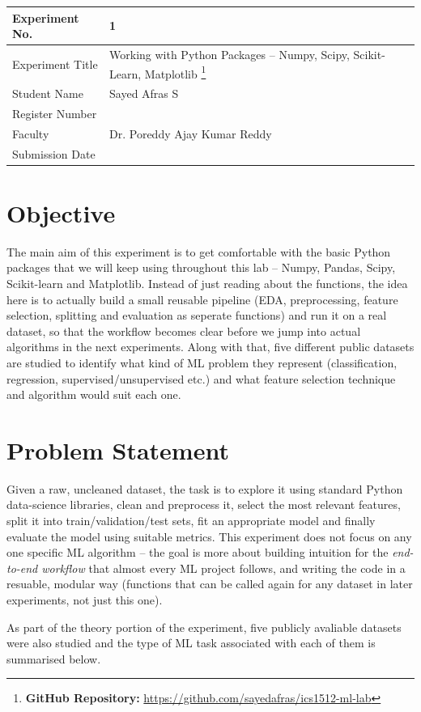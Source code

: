 \documentclass[12pt,a4paper]{article}
\begin{document}
\begin{tabular}{|p{4cm}|p{11cm}|}
\hline
Experiment No. & 1 \\ \hline
Experiment Title & Working with Python Packages -- Numpy, Scipy, Scikit-Learn, Matplotlib
\footnote{\textbf{GitHub Repository: }\url{https://github.com/sayedafras/ics1512-ml-lab}}\\ \hline
Student Name & Sayed Afras S \\ \hline
Register Number & \\ \hline
Faculty & Dr. Poreddy Ajay Kumar Reddy \\ \hline
Submission Date & \\ \hline
\end{tabular}

\section{Objective}
The main aim of this experiment is to get comfortable with the basic Python packages that we will keep using throughout this lab -- Numpy, Pandas, Scipy, Scikit-learn and Matplotlib. Instead of just reading about the functions, the idea here is to actually build a small reusable pipeline (EDA, preprocessing, feature selection, splitting and evaluation as seperate functions) and run it on a real dataset, so that the workflow becomes clear before we jump into actual algorithms in the next experiments. Along with that, five different public datasets are studied to identify what kind of ML problem they represent (classification, regression, supervised/unsupervised etc.) and what feature selection technique and algorithm would suit each one.

\section{Problem Statement}
Given a raw, uncleaned dataset, the task is to explore it using standard Python data-science libraries, clean and preprocess it, select the most relevant features, split it into train/validation/test sets, fit an appropriate model and finally evaluate the model using suitable metrics. This experiment does not focus on any one specific ML algorithm -- the goal is more about building intuition for the \textit{end-to-end workflow} that almost every ML project follows, and writing the code in a resuable, modular way (functions that can be called again for any dataset in later experiments, not just this one).

As part of the theory portion of the experiment, five publicly avaliable datasets were also studied and the type of ML task associated with each of them is summarised below.
\end{document}
